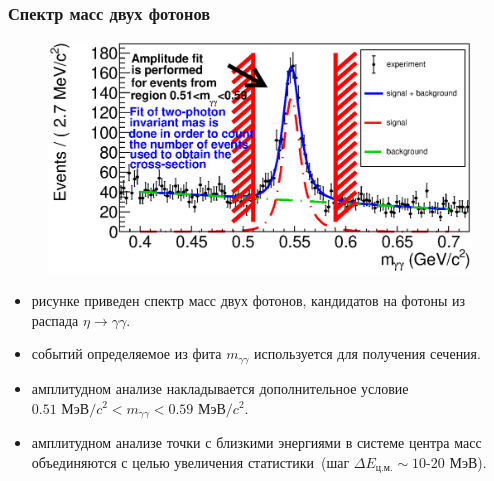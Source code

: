 \documentclass{beamer}
\begin{document}
  \begin{frame}
    \frametitle{Спектр масс двух фотонов}
    \begin{figure}
      \includegraphics[width=0.65\linewidth]{figures/mgg_e700.eps}
    \end{figure}
    \begin{itemize}
    \item{ рисунке приведен спектр масс двух фотонов, кандидатов на фотоны из
        распада $\eta\to\gamma\gamma$.}
    \item{ событий определяемое из фита $m_{\gamma\gamma}$ используется для получения
        сечения.}
    \item{ амплитудном анализе накладывается дополнительное условие
        $0.51\text{ МэВ}/c^2<m_{\gamma\gamma}<0.59\text{ МэВ}/c^2$.}
    \item{ амплитудном анализе точки с близкими энергиями в системе центра
        масс объединяются с целью увеличения
        статистики~(шаг $\Delta{E_{\text{ц.м.}}}\sim{10}\text{-}20\text{ МэВ}$).}
    \end{itemize}
  \end{frame}
\end{document}
